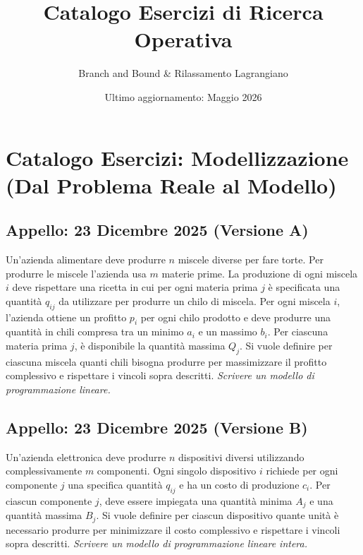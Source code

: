 \documentclass[11pt, a4paper]{article}
\title{\textbf{Catalogo Esercizi di Ricerca Operativa}}
\author{Branch and Bound \& Rilassamento Lagrangiano}
\date{Ultimo aggiornamento: Maggio 2026}
\begin{document}
\maketitle

\tableofcontents
\newpage
\section{Catalogo Esercizi: Modellizzazione (Dal Problema Reale al Modello)}

\subsection{Appello: 23 Dicembre 2025 (Versione A)}
Un’azienda alimentare deve produrre $n$ miscele diverse per fare torte. Per produrre le miscele l’azienda usa $m$ materie prime. La produzione di ogni miscela $i$ deve rispettare una ricetta in cui per ogni materia prima $j$ è specificata una quantità $q_{ij}$ da utilizzare per produrre un chilo di miscela. Per ogni miscela $i$, l’azienda ottiene un profitto $p_i$ per ogni chilo prodotto e deve produrre una quantità in chili compresa tra un minimo $a_i$ e un massimo $b_i$. Per ciascuna materia prima $j$, è disponibile la quantità massima $Q_j$. Si vuole definire per ciascuna miscela quanti chili bisogna produrre per massimizzare il profitto complessivo e rispettare i vincoli sopra descritti.
\textit{Scrivere un modello di programmazione lineare.}

\subsection{Appello: 23 Dicembre 2025 (Versione B)}
Un’azienda elettronica deve produrre $n$ dispositivi diversi utilizzando complessivamente $m$ componenti. Ogni singolo dispositivo $i$ richiede per ogni componente $j$ una specifica quantità $q_{ij}$ e ha un costo di produzione $c_i$. Per ciascun componente $j$, deve essere impiegata una quantità minima $A_j$ e una quantità massima $B_j$. Si vuole definire per ciascun dispositivo quante unità è necessario produrre per minimizzare il costo complessivo e rispettare i vincoli sopra descritti.
\textit{Scrivere un modello di programmazione lineare intera.}

\end{document}
